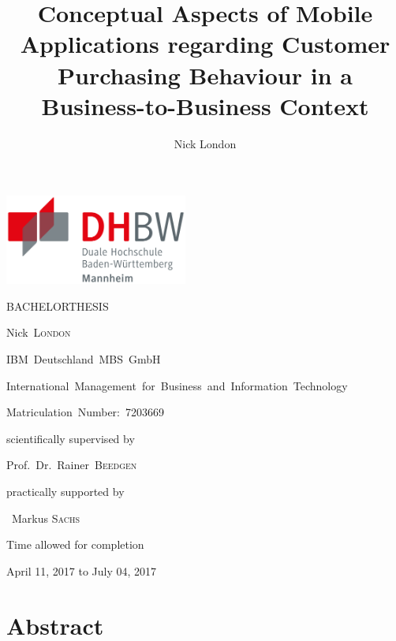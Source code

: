 \documentclass[12pt,a4paper,final,oneside,openright,onecolumn,titlepage]{scrbook}
\author{Nick London}
\title{Conceptual Aspects of Mobile Applications regarding Customer Purchasing Behaviour in a Business-to-Business Context}
\begin{document}
\begin{titlepage}
	\includegraphics[height=8em]{img/logos/dhbw.pdf}
	\hfill
	\par
	\centering
	\vfill
	{\huge \textsc{\MakeUppercase{Bachelorthesis}}\par}
	\vspace{2em}
	{\Huge \textbf{\thetitle}\par}
	\vspace{1.5em}
	{\large Nick~\textsc{London}\par}
	\vfill
	{\small IBM~Deutschland~MBS~GmbH\par
	International~Management~for~Business~and~Information~Technology \par
	Matriculation~Number:~7203669}
	\vfill
	{scientifically supervised by\par Prof.~Dr.~Rainer~\textsc{Beedgen}\par}
	\par\vspace{1em}
	{practically supported by\par ~Markus \textsc{Sachs}\par}
	\vspace{2em}
	{Time allowed for completion\par April 11, 2017 to July 04, 2017\par}
\end{titlepage}

\setcounter{page}{1}

\chapter*{Abstract}


\tableofcontents

\newpage
{}
\listoffigures
\end{document}
